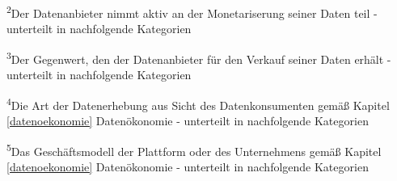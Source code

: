 \noindent \textsuperscript{2}Der Datenanbieter nimmt aktiv an der Monetariserung seiner Daten teil - unterteilt in nachfolgende Kategorien \newline

\noindent \textsuperscript{3}Der Gegenwert, den der Datenanbieter für den Verkauf seiner Daten erhält - unterteilt in nachfolgende Kategorien\newline

\noindent \textsuperscript{4}Die Art der Datenerhebung aus Sicht des Datenkonsumenten gemäß Kapitel \ref{datenoekonomie} Datenökonomie - unterteilt in nachfolgende Kategorien\newline

\noindent \textsuperscript{5}Das Geschäftsmodell der Plattform oder des Unternehmens gemäß Kapitel \ref{datenoekonomie} Datenökonomie - unterteilt in nachfolgende Kategorien\newline